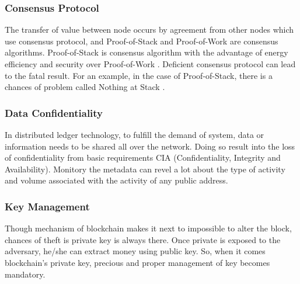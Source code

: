 \documentclass[a4paper,twoside,12pt]{report}
\begin{document}
\begin{spacing}{1.5}
\subsubsection{Consensus Protocol}
The transfer of value between node occurs by agreement from other nodes which use consensus protocol, and
Proof-of-Stack and Proof-of-Work are consensus algorithms. Proof-of-Stack is consensus algorithm with the advantage of energy efficiency and security over Proof-of-Work \cite{saad_exploring_2019}. Deficient consensus protocol can lead to the fatal result. For an example, in the case of Proof-of-Stack, there is a chances of  problem called Nothing at Stack \cite{wiki:proofofwork}.  
\subsubsection{Data Confidentiality}
In distributed ledger technology, to fulfill the demand of system, data or information needs to be shared all over the network. Doing so result into the loss of confidentiality from basic requirements CIA (Confidentiality, Integrity and Availability). Monitory the metadata can revel a lot about the type of activity and volume associated with the activity of any public address.
\subsubsection{Key Management}
Though mechanism of blockchain makes it next to impossible to alter the block, chances of theft is private key is always there. Once private is exposed to the adversary, he/she can extract money using public key. So, when it comes blockchain's private key, precious and proper management of key becomes mandatory.

\end{spacing}
\end{document}
